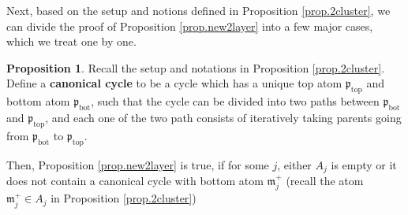 \documentclass[10pt, reqno]{amsart}
\newcommand{\mf}{\mathfrak m}
\newcommand{\pf}{\mathfrak p}
\theoremstyle{definition}
\newtheorem{proposition}[theorem]{Proposition}
\theoremstyle{remark}
\numberwithin{equation}{section}
\begin{document}
Next, based on the setup and notions defined in Proposition \ref{prop.2cluster}, we can divide the proof of Proposition \ref{prop.new2layer} into a few major cases, which we treat one by one.
\begin{proposition}\label{prop.newcase_1} Recall the setup and notations in Proposition \ref{prop.2cluster}. Define a \textbf{canonical cycle} to be a cycle which has a unique top atom $\pf_{\mathrm{top}}$ and bottom atom $\pf_{\mathrm{bot}}$, such that the cycle can be divided into two paths between $\pf_{\mathrm{bot}}$ and $\pf_{\mathrm{top}}$, and each one of the two path consists of iteratively taking parents going from $\pf_{\mathrm{bot}}$ to $\pf_{\mathrm{top}}$.

Then, Proposition \ref{prop.new2layer} is true, if for some $j$, either $A_j$ is empty or it does not contain a canonical cycle with bottom atom $\mf_j^+$ (recall the atom $\mf_j^+\in A_j$ in Proposition \ref{prop.2cluster})
\end{proposition}
\end{document}
